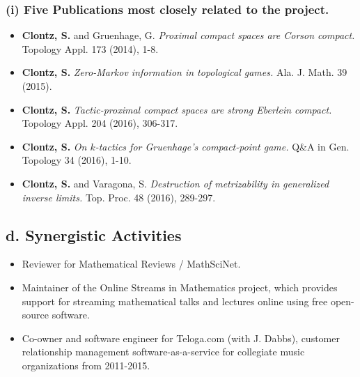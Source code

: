\documentclass{article}
\begin{document}
\subsubsection*{(i) Five Publications most closely related to the project.}
\begin{itemize}

  \item \textbf{Clontz, S.} and Gruenhage, G.
    \textit{Proximal compact spaces are Corson compact.}
    Topology Appl. 173 (2014), 1-8.
  \item \textbf{Clontz, S.}
    \textit{Zero-Markov information in topological games.}
    Ala. J. Math. 39 (2015).
  \item \textbf{Clontz, S.}
    \textit{Tactic-proximal compact spaces are strong Eberlein compact.}
    Topology Appl. 204 (2016), 306-317.
  \item \textbf{Clontz, S.}
    \textit{On \(k\)-tactics for Gruenhage's compact-point game.}
    Q\&A in Gen. Topology 34 (2016), 1-10.
  \item \textbf{Clontz, S.} and Varagona, S.
    \textit{Destruction of metrizability in generalized inverse limits.}
    Top. Proc. 48 (2016), 289-297.


\end{itemize}

\subsection*{d. Synergistic Activities}

\begin{itemize}%

  \item Reviewer for Mathematical Reviews / MathSciNet.
  \item Maintainer of the Online Streams in Mathematics project, which
  provides support for streaming mathematical talks and lectures online
  using free open-source software.
  \item Co-owner and software engineer for Teloga.com (with J. Dabbs),
        customer relationship
        management software-as-a-service for collegiate music organizations
        from 2011-2015.




\end{itemize}
\end{document}
